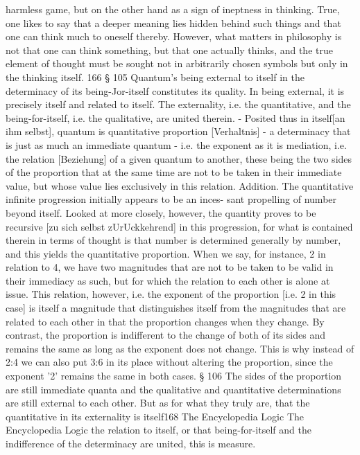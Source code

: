 {{harmless game, but on the other hand as a sign of ineptness in thinking. True, one
likes to say that a deeper meaning lies hidden behind such things and that one can
think much to oneself thereby. However, what matters in philosophy is not that
one can think something, but that one actually thinks, and the true element of
thought must be sought not in arbitrarily chosen symbols but only in the thinking
itself.
166
§ 105
Quantum's being external to itself in the determinacy of its being-Jor-itself
constitutes its quality. In being external, it is precisely itself and related
to itself. The externality, i.e. the quantitative, and the being-for-itself, i.e.
the qualitative, are united therein. - Posited thus in itself[an ihm selbst],
quantum is quantitative proportion [Verhaltnis] - a determinacy that is just
as much an immediate quantum - i.e. the exponent as it is mediation,
i.e. the relation [Beziehung] of a given quantum to another, these being the
two sides of the proportion that at the same time are not to be taken in
their immediate value, but whose value lies exclusively in this relation.
Addition. The quantitative infinite progression initially appears to be an inces-
sant propelling of number beyond itself. Looked at more closely, however, the
quantity proves to be recursive [zu sich selbst zUrUckkehrend] in this progression,
for what is contained therein in terms of thought is that number is determined
generally by number, and this yields the quantitative proportion. When we say,
for instance, 2 in relation to 4, we have two magnitudes that are not to be taken
to be valid in their immediacy as such, but for which the relation to each other
is alone at issue. This relation, however, i.e. the exponent of the proportion [i.e.
2 in this case] is itself a magnitude that distinguishes itself from the magnitudes
that are related to each other in that the proportion changes when they change.
By contrast, the proportion is indifferent to the change of both of its sides and
remains the same as long as the exponent does not change. This is why instead
of 2:4 we can also put 3:6 in its place without altering the proportion, since the
exponent '2' remains the same in both cases.
§ 106
The sides of the proportion are still immediate quanta and the qualitative
and quantitative determinations are still external to each other. But as
for what they truly are, that the quantitative in its externality is itself168
The Encyclopedia Logic The Encyclopedia Logic
the relation to itself, or that being-for-itself and the indifference of the
determinacy are united, this is measure.
}}
